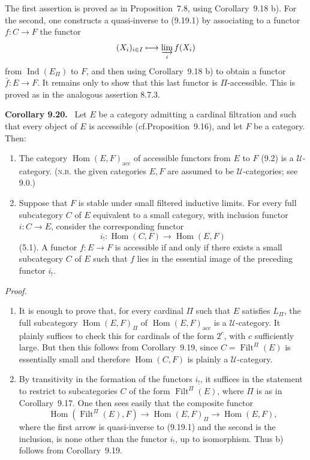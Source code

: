 \documentclass[11pt]{article}
\newcommand{\U}{\mathcal{U}}
\newcommand{\Ind}{\operatorname{Ind}}
\newcommand{\Filt}{\operatorname{Filt}}
\newcommand{\Hhom}{\operatorname{Hom}}
\newcommand{\acc}{\mathrm{acc}}
\newcommand{\cf}{cf.}
\newcommand{\NB}{\textsc{n.b.}}
\newenvironment{statement}[1]{\par\medskip\noindent\textbf{#1.}\ }{\par\medskip}
\newenvironment{prooftext}{\par\noindent\emph{Proof.}\ }{\par\medskip}
\begin{document}
The first assertion is proved as in Proposition~7.8, using Corollary~9.18 b). For the second, one constructs a quasi-inverse to (9.19.1) by associating to a functor $f:C\to F$ the functor
\[
 (X_i)_{i\in I}\longmapsto \varinjlim_i f(X_i)
\]
from $\Ind(E_\Pi)$ to $F$, and then using Corollary~9.18 b) to obtain a functor $\bar f:E\to F$. It remains only to show that this last functor is $\Pi$-accessible. This is proved as in the analogous assertion 8.7.3.

\begin{statement}{Corollary 9.20}
Let $E$ be a category admitting a cardinal filtration and such that every object of $E$ is accessible (\cf Proposition~9.16), and let $F$ be a category. Then:
\begin{enumerate}[label=\alph*)]
\item The category $\Hhom(E,F)_{\acc}$ of accessible functors from $E$ to $F$ (9.2) is a $\U$-category. (\NB{} the given categories $E,F$ are assumed to be $\U$-categories; see 9.0.)
\item Suppose that $F$ is stable under small filtered inductive limits. For every full subcategory $C$ of $E$ equivalent to a small category, with inclusion functor $i:C\to E$, consider the corresponding functor
\[
 i_!:\Hhom(C,F)\longrightarrow \Hhom(E,F)
\]
(5.1). A functor $f:E\to F$ is accessible if and only if there exists a small subcategory $C$ of $E$ such that $f$ lies in the essential image of the preceding functor $i_!$.
\end{enumerate}
\end{statement}

\begin{prooftext}
\begin{enumerate}[label=\alph*)]
\item It is enough to prove that, for every cardinal $\Pi$ such that $E$ satisfies $L_\Pi$, the full subcategory $\Hhom(E,F)_\Pi$ of $\Hhom(E,F)_{\acc}$ is a $\U$-category. It plainly suffices to check this for cardinals of the form $2^c$, with $c$ sufficiently large. But then this follows from Corollary~9.19, since $C=\Filt^\Pi(E)$ is essentially small and therefore $\Hhom(C,F)$ is plainly a $\U$-category.

\item By transitivity in the formation of the functors $i_!$, it suffices in the statement to restrict to subcategories $C$ of the form $\Filt^\Pi(E)$, where $\Pi$ is as in Corollary~9.17. One then sees easily that the composite functor
\[
\Hhom(\Filt^\Pi(E),F)\longrightarrow \Hhom(E,F)_\Pi\longrightarrow \Hhom(E,F),
\]
where the first arrow is quasi-inverse to (9.19.1) and the second is the inclusion, is none other than the functor $i_!$, up to isomorphism. Thus b) follows from Corollary~9.19.
\end{enumerate}
\end{prooftext}
\end{document}
